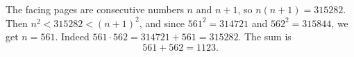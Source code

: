 The facing pages are consecutive numbers $n$ and $n+1$, so $n(n+1)=315282$. Then $n^2<315282<(n+1)^2$, and since $561^2=314721$ and $562^2=315844$, we get $n=561$. Indeed $561\cdot562=314721+561=315282$. The sum is
\[561+562=\boxed{1123}.\]
